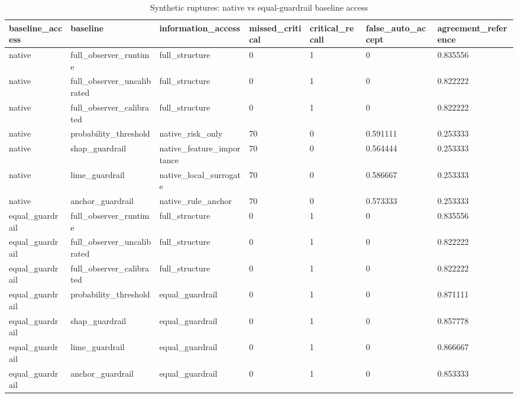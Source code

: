 \begin{table}[h]
\centering
\caption{Synthetic ruptures: native vs equal-guardrail baseline access}
\label{tab:synthetic\_guardrail\_modes}
\begin{tabular}{|l|l|l|l|l|l|l|}
\hline
baseline\_access & baseline & information\_access & missed\_critical & critical\_recall & false\_auto\_accept & agreement\_reference \\
\hline
native & full\_observer\_runtime & full\_structure & 0 & 1 & 0 & 0.835556 \\
\hline
native & full\_observer\_uncalibrated & full\_structure & 0 & 1 & 0 & 0.822222 \\
\hline
native & full\_observer\_calibrated & full\_structure & 0 & 1 & 0 & 0.822222 \\
\hline
native & probability\_threshold & native\_risk\_only & 70 & 0 & 0.591111 & 0.253333 \\
\hline
native & shap\_guardrail & native\_feature\_importance & 70 & 0 & 0.564444 & 0.253333 \\
\hline
native & lime\_guardrail & native\_local\_surrogate & 70 & 0 & 0.586667 & 0.253333 \\
\hline
native & anchor\_guardrail & native\_rule\_anchor & 70 & 0 & 0.573333 & 0.253333 \\
\hline
equal\_guardrail & full\_observer\_runtime & full\_structure & 0 & 1 & 0 & 0.835556 \\
\hline
equal\_guardrail & full\_observer\_uncalibrated & full\_structure & 0 & 1 & 0 & 0.822222 \\
\hline
equal\_guardrail & full\_observer\_calibrated & full\_structure & 0 & 1 & 0 & 0.822222 \\
\hline
equal\_guardrail & probability\_threshold & equal\_guardrail & 0 & 1 & 0 & 0.871111 \\
\hline
equal\_guardrail & shap\_guardrail & equal\_guardrail & 0 & 1 & 0 & 0.857778 \\
\hline
equal\_guardrail & lime\_guardrail & equal\_guardrail & 0 & 1 & 0 & 0.866667 \\
\hline
equal\_guardrail & anchor\_guardrail & equal\_guardrail & 0 & 1 & 0 & 0.853333 \\
\hline
\end{tabular}
\end{table}
